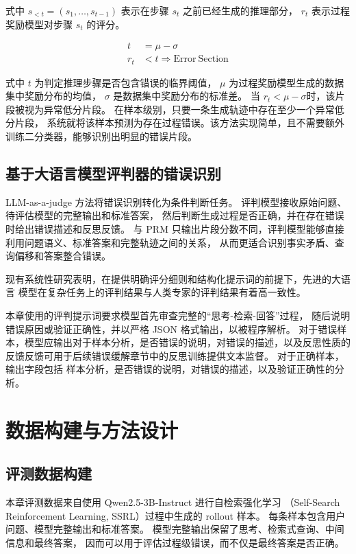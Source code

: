式中 \(s_{<t} = (s_1, \ldots, s_{t-1})\) 表示在步骤 \(s_t\) 之前已经生成的推理部分，
\(r_t\) 表示过程奖励模型对步骤 \(s_t\) 的评分。


\begin{align}
t &= \mu - \sigma \\
r_t &< t \Rightarrow \mathrm{Error\ Section} 
\end{align}

式中 \(t\) 为判定推理步骤是否包含错误的临界阈值，
\(\mu\) 为过程奖励模型生成的数据集中奖励分布的均值，
\(\sigma\) 是数据集中奖励分布的标准差。
当 \(r_t < \mu - \sigma\)时，该片段被视为异常低分片段。
在样本级别，只要一条生成轨迹中存在至少一个异常低分片段，
系统就将该样本预测为存在过程错误。该方法实现简单，且不需要额外训练二分类器，能够识别出明显的错误片段。

\subsection{基于大语言模型评判器的错误识别}

LLM-as-a-judge 方法将错误识别转化为条件判断任务。
评判模型接收原始问题、待评估模型的完整输出和标准答案，
然后判断生成过程是否正确，并在存在错误时给出错误描述和反思反馈。
与 PRM 只输出片段分数不同，评判模型能够直接利用问题语义、标准答案和完整轨迹之间的关系，
从而更适合识别事实矛盾、查询偏移和答案整合错误\cite{ref15_he2025large}。

现有系统性研究\cite{zheng2023judging}表明，在提供明确评分细则和结构化提示词的前提下，先进的大语言
模型在复杂任务上的评判结果与人类专家的评判结果有着高一致性。

本章使用的评判提示词要求模型首先审查完整的“思考-检索-回答”过程，
随后说明错误原因或验证正确性，并以严格 JSON 格式输出，以被程序解析。
对于错误样本，模型应输出对于样本分析，是否错误的说明，对错误的描述，以及反思性质的反馈反馈可用于后续错误缓解章节中的反思训练提供文本监督。
对于正确样本，输出字段包括
样本分析，是否错误的说明，对错误的描述，以及验证正确性的分析。

\section{数据构建与方法设计}

\subsection{评测数据构建}

本章评测数据来自使用 Qwen2.5-3B-Instruct 进行自检索强化学习
（Self-Search Reinforcement Learning, SSRL）过程中生成的 rollout 样本。
每条样本包含用户问题、模型完整输出和标准答案。
模型完整输出保留了思考、检索式查询、中间信息和最终答案，
因而可以用于评估过程级错误，而不仅是最终答案是否正确。

